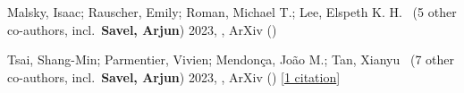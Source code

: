 \item[{\color{numcolor}\scriptsize2}] Malsky, Isaac; Rauscher, Emily; Roman, Michael T.; Lee, Elspeth K. H. \etal\ ({5} other co-authors, incl.\ \textbf{Savel, Arjun}) 2023, , ArXiv ()

\item[{\color{numcolor}\scriptsize1}] Tsai, Shang-Min; Parmentier, Vivien; Mendon{\c{c}}a, Jo{\~a}o M.; Tan, Xianyu \etal\ ({7} other co-authors, incl.\ \textbf{Savel, Arjun}) 2023, , ArXiv () [\href{https://ui.adsabs.harvard.edu/abs/2023arXiv231017751T}{1 citation}]